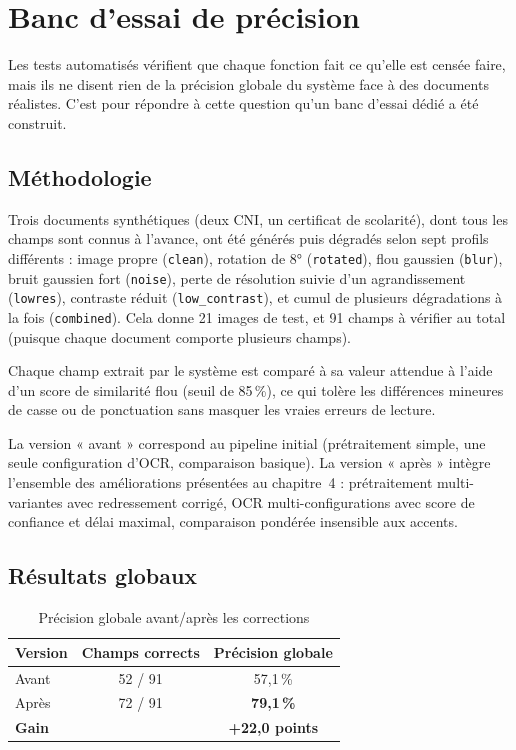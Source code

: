 \section{Banc d'essai de précision}

Les tests automatisés vérifient que chaque fonction fait ce qu'elle est censée faire, mais ils ne disent rien de la précision globale du système face à des documents réalistes. C'est pour répondre à cette question qu'un banc d'essai dédié a été construit.

\subsection{Méthodologie}

Trois documents synthétiques (deux CNI, un certificat de scolarité), dont tous les champs sont connus à l'avance, ont été générés puis dégradés selon sept profils différents : image propre (\texttt{clean}), rotation de 8° (\texttt{rotated}), flou gaussien (\texttt{blur}), bruit gaussien fort (\texttt{noise}), perte de résolution suivie d'un agrandissement (\texttt{lowres}), contraste réduit (\texttt{low\_contrast}), et cumul de plusieurs dégradations à la fois (\texttt{combined}). Cela donne 21 images de test, et 91 champs à vérifier au total (puisque chaque document comporte plusieurs champs).

Chaque champ extrait par le système est comparé à sa valeur attendue à l'aide d'un score de similarité flou (seuil de 85\,\%), ce qui tolère les différences mineures de casse ou de ponctuation sans masquer les vraies erreurs de lecture.

La version « avant » correspond au pipeline initial (prétraitement simple, une seule configuration d'OCR, comparaison basique). La version « après » intègre l'ensemble des améliorations présentées au chapitre~4 : prétraitement multi-variantes avec redressement corrigé, OCR multi-configurations avec score de confiance et délai maximal, comparaison pondérée insensible aux accents.

\subsection{Résultats globaux}

\begin{table}[H]
\centering
\caption{Précision globale avant/après les corrections}
\label{tab:resultats-globaux}
\begin{tabular}{lcc}
\toprule
Version & Champs corrects & Précision globale \\
\midrule
Avant & 52 / 91 & 57,1\,\% \\
Après & 72 / 91 & \textbf{79,1\,\%} \\
\midrule
\textbf{Gain} & & \textbf{+22,0 points} \\
\bottomrule
\end{tabular}
\end{table}

